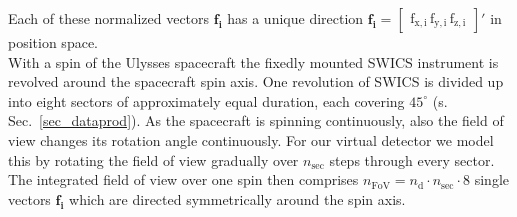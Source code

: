 Each of these normalized vectors $\mathrm{\mathbf{f_i}}$ has a unique direction $\mathrm{\mathbf{f_i} = \begin{bmatrix}f_{x,i}\,f_{y,i}\,f_{z,i}\end{bmatrix}}'$ in position space.
\\
With a spin of the Ulysses spacecraft the fixedly mounted SWICS instrument is revolved around the spacecraft spin axis. One revolution of SWICS is divided up into eight sectors of approximately equal duration, each covering $45^\circ$ (s. Sec.~\ref{sec_dataprod}). As the spacecraft is spinning continuously, also the field of view changes its rotation angle continuously. For our virtual detector we model this by rotating the field of view gradually over $n_\mathrm{sec}$ steps through every sector.\\
The integrated field of view over one spin then comprises $n_\mathrm{FoV} = n_\mathrm{d} \cdot n_\mathrm{sec} \cdot 8$ single vectors $\mathrm{\mathbf{f_i}}$ which are directed symmetrically around the spin axis.
%
%
%
